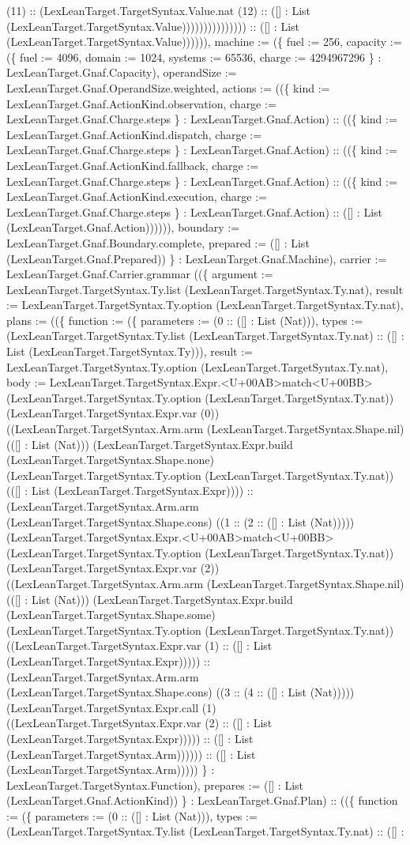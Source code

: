 \documentclass[11pt]{article}
\begin{document}
(11) :: (LexLeanTarget.TargetSyntax.Value.nat (12) :: ([] : List (LexLeanTarget.TargetSyntax.Value))))))))))))))) :: ([] : List (LexLeanTarget.TargetSyntax.Value)))))), machine := (\{ fuel := 256, capacity := (\{ fuel := 4096, domain := 1024, systems := 65536, charge := 4294967296 \} : LexLeanTarget.Gnaf.Capacity), operandSize := LexLeanTarget.Gnaf.OperandSize.weighted, actions := ((\{ kind := LexLeanTarget.Gnaf.ActionKind.observation, charge := LexLeanTarget.Gnaf.Charge.steps \} : LexLeanTarget.Gnaf.Action) :: ((\{ kind := LexLeanTarget.Gnaf.ActionKind.dispatch, charge := LexLeanTarget.Gnaf.Charge.steps \} : LexLeanTarget.Gnaf.Action) :: ((\{ kind := LexLeanTarget.Gnaf.ActionKind.fallback, charge := LexLeanTarget.Gnaf.Charge.steps \} : LexLeanTarget.Gnaf.Action) :: ((\{ kind := LexLeanTarget.Gnaf.ActionKind.execution, charge := LexLeanTarget.Gnaf.Charge.steps \} : LexLeanTarget.Gnaf.Action) :: ([] : List (LexLeanTarget.Gnaf.Action)))))), boundary := LexLeanTarget.Gnaf.Boundary.complete, prepared := ([] : List (LexLeanTarget.Gnaf.Prepared)) \} : LexLeanTarget.Gnaf.Machine), carrier := LexLeanTarget.Gnaf.Carrier.grammar ((\{ argument := LexLeanTarget.TargetSyntax.Ty.list (LexLeanTarget.TargetSyntax.Ty.nat), result := LexLeanTarget.TargetSyntax.Ty.option (LexLeanTarget.TargetSyntax.Ty.nat), plans := ((\{ function := (\{ parameters := (0 :: ([] : List (Nat))), types := (LexLeanTarget.TargetSyntax.Ty.list (LexLeanTarget.TargetSyntax.Ty.nat) :: ([] : List (LexLeanTarget.TargetSyntax.Ty))), result := LexLeanTarget.TargetSyntax.Ty.option (LexLeanTarget.TargetSyntax.Ty.nat), body := LexLeanTarget.TargetSyntax.Expr.<U+00AB>match<U+00BB> (LexLeanTarget.TargetSyntax.Ty.option (LexLeanTarget.TargetSyntax.Ty.nat)) (LexLeanTarget.TargetSyntax.Expr.var (0)) ((LexLeanTarget.TargetSyntax.Arm.arm (LexLeanTarget.TargetSyntax.Shape.nil) (([] : List (Nat))) (LexLeanTarget.TargetSyntax.Expr.build (LexLeanTarget.TargetSyntax.Shape.none) (LexLeanTarget.TargetSyntax.Ty.option (LexLeanTarget.TargetSyntax.Ty.nat)) (([] : List (LexLeanTarget.TargetSyntax.Expr)))) :: (LexLeanTarget.TargetSyntax.Arm.arm (LexLeanTarget.TargetSyntax.Shape.cons) ((1 :: (2 :: ([] : List (Nat))))) (LexLeanTarget.TargetSyntax.Expr.<U+00AB>match<U+00BB> (LexLeanTarget.TargetSyntax.Ty.option (LexLeanTarget.TargetSyntax.Ty.nat)) (LexLeanTarget.TargetSyntax.Expr.var (2)) ((LexLeanTarget.TargetSyntax.Arm.arm (LexLeanTarget.TargetSyntax.Shape.nil) (([] : List (Nat))) (LexLeanTarget.TargetSyntax.Expr.build (LexLeanTarget.TargetSyntax.Shape.some) (LexLeanTarget.TargetSyntax.Ty.option (LexLeanTarget.TargetSyntax.Ty.nat)) ((LexLeanTarget.TargetSyntax.Expr.var (1) :: ([] : List (LexLeanTarget.TargetSyntax.Expr))))) :: (LexLeanTarget.TargetSyntax.Arm.arm (LexLeanTarget.TargetSyntax.Shape.cons) ((3 :: (4 :: ([] : List (Nat))))) (LexLeanTarget.TargetSyntax.Expr.call (1) ((LexLeanTarget.TargetSyntax.Expr.var (2) :: ([] : List (LexLeanTarget.TargetSyntax.Expr))))) :: ([] : List (LexLeanTarget.TargetSyntax.Arm)))))) :: ([] : List (LexLeanTarget.TargetSyntax.Arm))))) \} : LexLeanTarget.TargetSyntax.Function), prepares := ([] : List (LexLeanTarget.Gnaf.ActionKind)) \} : LexLeanTarget.Gnaf.Plan) :: ((\{ function := (\{ parameters := (0 :: ([] : List (Nat))), types := (LexLeanTarget.TargetSyntax.Ty.list (LexLeanTarget.TargetSyntax.Ty.nat) :: ([] : 
\end{document}
